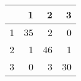 \begin{tabular}{rrrr}
  \hline
 & 1 & 2 & 3 \\ 
  \hline
1 &  35 &   2 &   0 \\ 
  2 &   1 &  46 &   1 \\ 
  3 &   0 &   3 &  30 \\ 
   \hline
\end{tabular}
